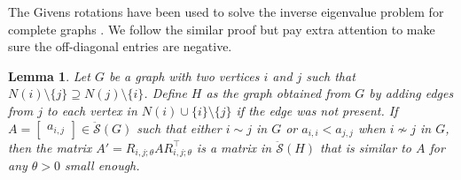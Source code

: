 \documentclass{article}
\newtheorem{lemma}[theorem]{Lemma}
\theoremstyle{definition}
\newcommand{\trans}{^\top}
\newcommand{\mdso}{\ddot{\mathcal{S}}}
\begin{document}
The Givens rotations have been used to solve the inverse eigenvalue problem for complete graphs \cite{BLMNSSSY13}.  We follow the similar proof but pay extra attention to make sure the off-diagonal entries are negative.

\begin{lemma}
\label{lem:givens}
Let $G$ be a graph with two vertices $i$ and $j$ such that $N(i)\setminus\{j\} \supseteq N(j)\setminus\{i\}$.  Define $H$ as the graph obtained from $G$ by adding edges from $j$ to each vertex in $N(i)\cup\{i\}\setminus\{j\}$ if the edge was not present.  If $A = \begin{bmatrix} a_{i,j} \end{bmatrix} \in \mdso(G)$ such that either $i \sim j$ in $G$ or $a_{i,i} < a_{j,j}$ when $i \nsim j$ in $G$, then the matrix $A' = R_{i,j;\theta} A R_{i,j;\theta}\trans$ is a matrix in $\mdso(H)$ that is similar to $A$ for any $\theta > 0$ small enough.
\end{lemma}
\end{document}
